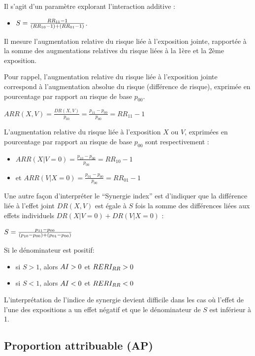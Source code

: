 \documentclass[
]{book}
\providecommand{\tightlist}{%
  \setlength{\itemsep}{0pt}\setlength{\parskip}{0pt}}
\begin{document}
Il s'agit d'un paramètre explorant l'interaction additive :

\begin{itemize}
\tightlist
\item
  \(\small S = \frac{RR_{11} - 1}{(RR_{10} - 1) + (RR_{01}-1)}\).
\end{itemize}

Il mesure l'augmentation relative du risque liée à l'exposition jointe, rapportée à la somme des augmentations relatives du risque liées à la 1ère et la 2ème exposition.

Pour rappel, l'augmentation relative du risque liée à l'exposition jointe correspond à l'augmentation absolue du risque (différence de risque), exprimée en pourcentage par rapport au risque de base \(p_{00}\).

\(ARR(X,V) = \frac{DR(X,V)}{p_{00}} = \frac{p_{11}-p_{00}}{p_{00}}= RR_{11}-1\)

L'augmentation relative du risque liée à l'exposition \(X\) ou \(V\), exprimées en pourcentage par rapport au risque de base \(p_{00}\) sont respectivement :

\begin{itemize}
\tightlist
\item
  \(ARR(X|V=0) = \frac{p_{10}-p_{00}}{p_{00}}= RR_{10}-1\)
\item
  et \(ARR(V|X=0) = \frac{p_{01}-p_{00}}{p_{00}}= RR_{01}-1\)
\end{itemize}

Une autre façon d'interpréter le ``Synergie index'' est d'indiquer que la différence liée à l'effet joint \(DR(X,V)\) est égale à \(S\) fois la somme des différences liées aux effets individuels \(DR(X|V=0) + DR(V|X=0)\) :

\(\small S = \frac{p_{11}-p_{00}}{(p_{10}-p_{00}) + (p_{01} - p_{00})}\)

Si le dénominateur est positif:

\begin{itemize}
\tightlist
\item
  si \(S > 1\), alors \(\small AI > 0\) et \(\small RERI_{RR} > 0\)
\item
  si \(S < 1\), alors \(\small AI < 0\) et \(\small RERI_{RR} < 0\)
\end{itemize}

L'interprétation de l'indice de synergie devient difficile dans les cas où l'effet de l'une des expositions a un effet négatif et que le dénominateur de \(S\) est inférieur à 1.

\hypertarget{proportion-attribuable-ap}{%
\subsection{Proportion attribuable (AP)}\label{proportion-attribuable-ap}}
\end{document}
